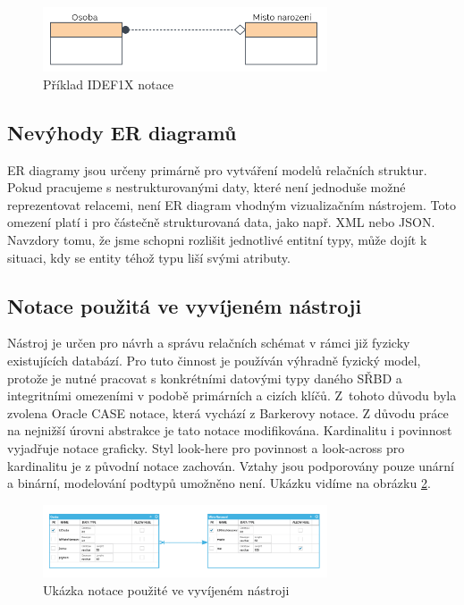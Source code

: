 \documentclass[czech,bachelor,public,dept460,male,oneside]{diploma}
\begin{document}
		\begin{figure}[!h]
			\centering
			\includegraphics[width=0.75\textwidth]{Figures/NotationExIDEF1X}
			\caption[Příklad IDEF1X notace]{Příklad IDEF1X notace \cite{whatIsERD}}
			\label{fig:notationExIDEF1X}
		\end{figure}
	
	\subsection{Nevýhody ER diagramů}
	ER diagramy jsou určeny primárně pro vytváření modelů relačních struktur. Pokud pracujeme s nestrukturovanými daty, které není jednoduše možné reprezentovat relacemi, není ER diagram vhodným vizualizačním nástrojem. Toto omezení platí i pro částečně strukturovaná data, jako např. XML nebo JSON. Navzdory tomu, že jsme schopni rozlišit jednotlivé entitní typy, může dojít k situaci, kdy se entity téhož typu liší svými atributy. 
	
	\subsection{Notace použitá ve vyvíjeném nástroji}
	Nástroj je určen pro návrh a správu relačních schémat v rámci již fyzicky existujících databází. Pro tuto činnost je používán výhradně fyzický model, protože je nutné pracovat s konkrétními datovými typy daného SŘBD a integritními omezeními v podobě primárních a cizích klíčů. Z~tohoto důvodu byla zvolena Oracle CASE notace, která vychází z Barkerovy notace. Z důvodu práce na nejnižší úrovni abstrakce je tato notace modifikována. Kardinalitu i povinnost vyjadřuje notace graficky. Styl look-here pro povinnost a look-across pro kardinalitu je z původní notace zachován. Vztahy jsou podporovány pouze unární a binární, modelování podtypů umožněno není. Ukázku vidíme na obrázku \ref{fig:notationERDModeler}.
	
	\begin{figure}[!h]
		\centering
		\includegraphics[width=0.75\textwidth]{Figures/ScreenNotationEx}
		\caption{Ukázka notace použité ve vyvíjeném nástroji}
		\label{fig:notationERDModeler}
	\end{figure}
	
\end{document}
